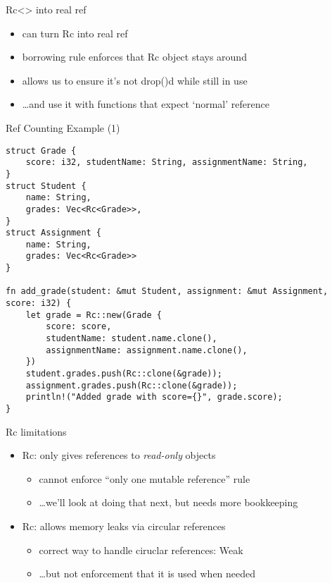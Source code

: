 \begin{frame}{Rc<> into real ref}
    \begin{itemize}
    \item can turn Rc into real ref
    \item borrowing rule enforces that Rc object stays around
    \vspace{.5cm}
    \item allows us to ensure it's not drop()d while still in use
    \item \ldots and use it with functions that expect `normal' reference
    \end{itemize}
\end{frame}



\begin{frame}[fragile,label=refCountingEx]{Ref Counting Example (1)}
\begin{verbatim}
struct Grade {
    score: i32, studentName: String, assignmentName: String,
}
struct Student {
    name: String,
    grades: Vec<Rc<Grade>>,
}
struct Assignment {
    name: String,
    grades: Vec<Rc<Grade>>
}

fn add_grade(student: &mut Student, assignment: &mut Assignment, score: i32) {
    let grade = Rc::new(Grade {
        score: score,
        studentName: student.name.clone(),
        assignmentName: assignment.name.clone(),
    })
    student.grades.push(Rc::clone(&grade));
    assignment.grades.push(Rc::clone(&grade));
    println!("Added grade with score={}", grade.score);
}
\end{verbatim}
\end{frame}

\begin{frame}{Rc limitations}
    \begin{itemize}
    \item Rc: only gives references to \textit{read-only} objects
        \begin{itemize}
        \item cannot enforce ``only one mutable reference'' rule
        \item \ldots we'll look at doing that next, but needs more bookkeeping
        \end{itemize}
    \item Rc: allows memory leaks via circular references
        \begin{itemize}
        \item correct way to handle ciruclar references: Weak
        \item \ldots but not enforcement that it is used when needed
        \end{itemize}
    \end{itemize}
\end{frame}

